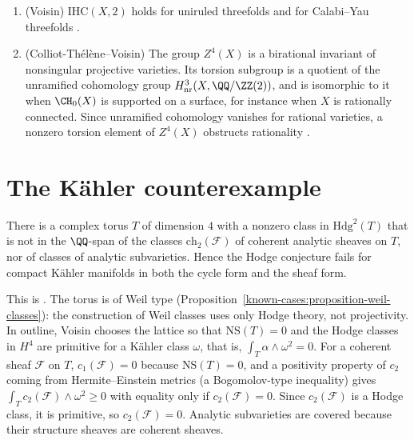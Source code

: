 \begin{theorem}\label{known-cases:theorem-what-survives}
\begin{enumerate}
\item (Voisin) $\mathrm{IHC}(X, 2)$ holds for uniruled threefolds and for Calabi--Yau threefolds \cite{voisin-2006}.
\item (Colliot-Th\'el\`ene--Voisin) The group $Z^4(X)$ is a birational invariant of nonsingular projective varieties. Its torsion subgroup is a quotient of the unramified cohomology group
$H^3_{\mathrm{nr}}(X, \QQ/\ZZ(2))$, and is isomorphic to it when $\CH_0(X)$ is supported on a surface, for instance when $X$ is rationally connected. Since unramified cohomology vanishes for
rational varieties, a nonzero torsion element of $Z^4(X)$ obstructs rationality \cite{colliot-thelene-voisin-2012}.
\end{enumerate}
\end{theorem}

\section{The K\"ahler counterexample}\label{known-cases:section-kahler}

\begin{theorem}[Voisin]\label{known-cases:theorem-voisin-kahler}
There is a complex torus $T$ of dimension $4$ with a nonzero class in $\mathrm{Hdg}^2(T)$ that is not in the $\QQ$-span of the classes $\mathrm{ch}_2(\mathcal{F})$ of coherent analytic sheaves on $T$, nor of classes of
analytic subvarieties. Hence the Hodge conjecture fails for compact K\"ahler manifolds in both the cycle form and the sheaf form.
\end{theorem}

This is \cite{voisin-2002}. The torus is of Weil type (Proposition~\ref{known-cases:proposition-weil-classes}): the construction of Weil classes uses only Hodge theory, not projectivity. In outline,
Voisin chooses the lattice so that $\mathrm{NS}(T) = 0$ and the Hodge classes in $H^4$ are primitive for a K\"ahler class $\omega$, that is, $\int_T\alpha \wedge \omega^2 = 0$. For a coherent sheaf
$\mathcal{F}$ on $T$, $c_1(\mathcal{F}) = 0$ because $\mathrm{NS}(T) = 0$, and a positivity property of $c_2$ coming from Hermite--Einstein metrics (a Bogomolov-type inequality) gives
$\int_Tc_2(\mathcal{F}) \wedge \omega^2 \geq 0$ with equality only if $c_2(\mathcal{F}) = 0$. Since $c_2(\mathcal{F})$ is a Hodge class, it is primitive, so $c_2(\mathcal{F}) = 0$. Analytic subvarieties are
covered because their structure sheaves are coherent sheaves.

